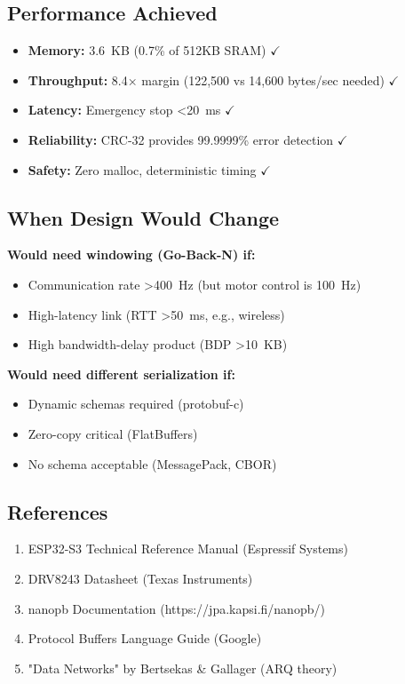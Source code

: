 \subsection{Performance Achieved}

\begin{itemize}
    \item \textbf{Memory:} 3.6~KB (0.7\% of 512KB SRAM) $\checkmark$
    \item \textbf{Throughput:} 8.4× margin (122,500 vs 14,600 bytes/sec needed) $\checkmark$
    \item \textbf{Latency:} Emergency stop <20~ms $\checkmark$
    \item \textbf{Reliability:} CRC-32 provides 99.9999\% error detection $\checkmark$
    \item \textbf{Safety:} Zero malloc, deterministic timing $\checkmark$
\end{itemize}

\subsection{When Design Would Change}

\textbf{Would need windowing (Go-Back-N) if:}
\begin{itemize}
    \item Communication rate >400~Hz (but motor control is 100~Hz)
    \item High-latency link (RTT >50~ms, e.g., wireless)
    \item High bandwidth-delay product (BDP >10~KB)
\end{itemize}

\textbf{Would need different serialization if:}
\begin{itemize}
    \item Dynamic schemas required (protobuf-c)
    \item Zero-copy critical (FlatBuffers)
    \item No schema acceptable (MessagePack, CBOR)
\end{itemize}

\subsection{References}

\begin{enumerate}
    \item ESP32-S3 Technical Reference Manual (Espressif Systems)
    \item DRV8243 Datasheet (Texas Instruments)
    \item nanopb Documentation (https://jpa.kapsi.fi/nanopb/)
    \item Protocol Buffers Language Guide (Google)
    \item "Data Networks" by Bertsekas \& Gallager (ARQ theory)
\end{enumerate}

